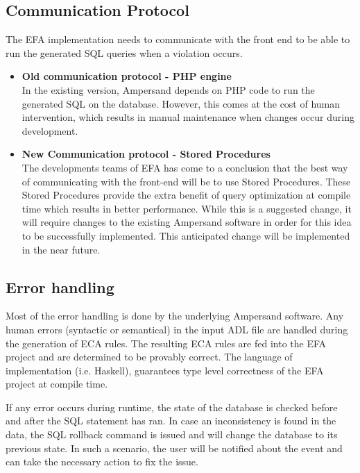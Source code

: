 \documentclass[12pt, svgnames]{article}
\let\Oldsubsection\subsection
\renewcommand{\subsection}{\FloatBarrier\Oldsubsection}
\begin{document}
\subsection{Communication Protocol}
The EFA implementation needs to communicate with the front end to be able to 
run the generated SQL queries when a violation occurs. 
	\begin{itemize}
		\item \textbf{Old communication protocol -  PHP engine} \\
			In the existing version, Ampersand depends on PHP code to run the 
			generated SQL on the database. However, this comes at the cost of 
			human intervention, which results in manual maintenance when 
			changes occur during development. 
		\item \textbf{New Communication protocol - Stored Procedures} \\
			The developments teams of EFA has come to a conclusion that the 
			best way of communicating with the front-end will be to use Stored 
			Procedures\cite{SP}. These Stored Procedures provide the extra 
			benefit of query optimization at compile time which results in 
			better performance. While this is a suggested change, it will 
			require changes to the existing Ampersand software in order for 
			this idea to be successfully implemented. This anticipated 
			change will be implemented in the near future.
			
	\end{itemize}

\subsection{Error handling}
Most of the error handling is done by the underlying Ampersand software. Any 
human errors (syntactic or semantical) in the input ADL file are handled during 
the generation of ECA rules. The resulting ECA rules are fed into the EFA 
project and are determined to be provably correct. The 
language of implementation (i.e. Haskell), 
guarantees type level correctness of the EFA project at compile time. 

If any error occurs during runtime, the state of the database is checked 
before and after the SQL statement has ran. In case an inconsistency is found 
in the data, the SQL rollback command is issued and will change 
the database to its previous state. In such a scenario, the user will be 
notified about the event and can take the necessary action to fix the issue. 
\end{document}
